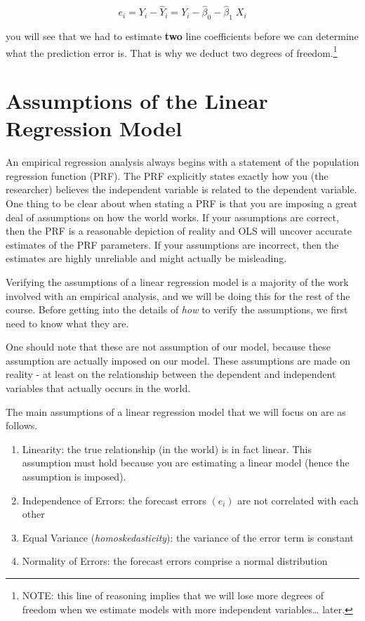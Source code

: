 \documentclass[
]{book}
\begin{document}
\[ e_i = Y_i - \hat{Y}_i = Y_i - \hat{\beta}_0 - \hat{\beta}_1 \; X_i\]

you will see that we had to estimate \textbf{two} line coefficients before we can determine what the prediction error is. That is why we deduct two degrees of freedom.\footnote{NOTE: this line of reasoning implies that we will lose more degrees of freedom when we estimate models with more independent variables\ldots{} later.}

\hypertarget{assumptions-of-the-linear-regression-model}{%
\section{Assumptions of the Linear Regression Model}\label{assumptions-of-the-linear-regression-model}}

An empirical regression analysis always begins with a statement of the population regression function (PRF). The PRF explicitly states exactly how you (the researcher) believes the independent variable is related to the dependent variable. One thing to be clear about when stating a PRF is that you are imposing a great deal of assumptions on how the world works. If your assumptions are correct, then the PRF is a reasonable depiction of reality and OLS will uncover accurate estimates of the PRF parameters. If your assumptions are incorrect, then the estimates are highly unreliable and might actually be misleading.

Verifying the assumptions of a linear regression model is a majority of the work involved with an empirical analysis, and we will be doing this for the rest of the course. Before getting into the details of \emph{how} to verify the assumptions, we first need to know what they are.

One should note that these are not assumption of our model, because these assumption are actually imposed on our model. These assumptions are made on reality - at least on the relationship between the dependent and independent variables that actually occurs in the world.

The main assumptions of a linear regression model that we will focus on are as follows.

\begin{enumerate}
\def\labelenumi{\arabic{enumi}.}
\item
  Linearity: the true relationship (in the world) is in fact linear. This assumption must hold because you are estimating a linear model (hence the assumption is imposed).
\item
  Independence of Errors: the forecast errors \((e_i)\) are not correlated with each other
\item
  Equal Variance (\emph{homoskedasticity}): the variance of the error term is constant
\item
  Normality of Errors: the forecast errors comprise a normal distribution
\end{enumerate}
\end{document}

